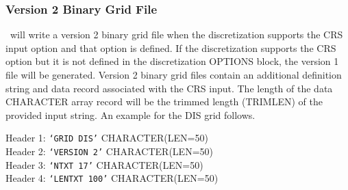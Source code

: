 \newpage
\subsubsection{Version 2 Binary Grid File}
\mf~will write a version 2 binary grid file when the discretization supports the CRS input option and that option is defined.  If the discretization supports the CRS option but it is not defined in the discretization OPTIONS block, the version 1 file will be generated.  Version 2 binary grid files contain an additional definition string and data record associated with the CRS input.  The length of the data CHARACTER array record will be the trimmed length (TRIMLEN) of the provided input string.  An example for the DIS grid follows.

\vspace{5mm}
\noindent Header 1: \texttt{`GRID DIS'}  {\color{red} \footnotesize{CHARACTER(LEN=50)}} \\
\noindent Header 2: \texttt{`VERSION 2'}  {\color{red} \footnotesize{CHARACTER(LEN=50)}} \\
\noindent Header 3: \texttt{`NTXT 17'} {\color{red} \footnotesize{CHARACTER(LEN=50)}}\\
\noindent Header 4: \texttt{`LENTXT 100'} {\color{red} \footnotesize{CHARACTER(LEN=50)}}\\

